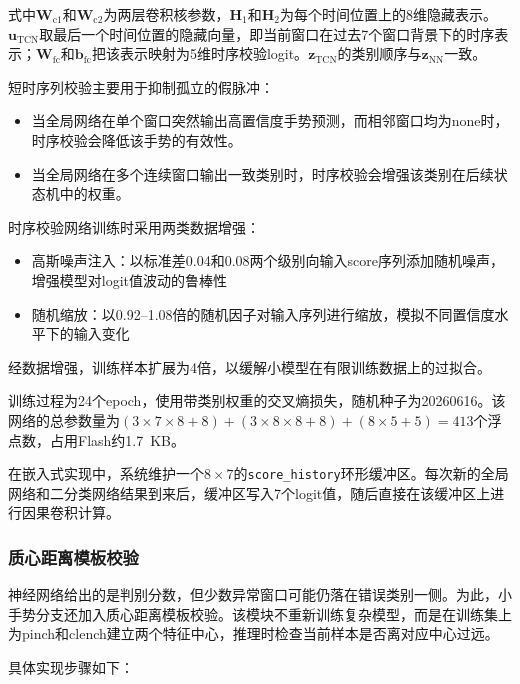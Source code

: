 \documentclass[lettersize,journal]{IEEEtran}
\begin{document}
式中$\mathbf{W}_\mathrm{c1}$和$\mathbf{W}_\mathrm{c2}$为两层卷积核参数，$\mathbf{H}_1$和$\mathbf{H}_2$为每个时间位置上的8维隐藏表示。$\mathbf{u}_\mathrm{TCN}$取最后一个时间位置的隐藏向量，即当前窗口在过去7个窗口背景下的时序表示；$\mathbf{W}_\mathrm{fc}$和$\mathbf{b}_\mathrm{fc}$把该表示映射为5维时序校验logit。$\mathbf{z}_\mathrm{TCN}$的类别顺序与$\mathbf{z}_\mathrm{NN}$一致。

短时序列校验主要用于抑制孤立的假脉冲：
\begin{itemize}[leftmargin=*]
    \item 当全局网络在单个窗口突然输出高置信度手势预测，而相邻窗口均为none时，时序校验会降低该手势的有效性。
    \item 当全局网络在多个连续窗口输出一致类别时，时序校验会增强该类别在后续状态机中的权重。
\end{itemize}

时序校验网络训练时采用两类数据增强：
\begin{itemize}[leftmargin=*]
    \item 高斯噪声注入：以标准差0.04和0.08两个级别向输入score序列添加随机噪声，增强模型对logit值波动的鲁棒性
    \item 随机缩放：以0.92--1.08倍的随机因子对输入序列进行缩放，模拟不同置信度水平下的输入变化
\end{itemize}

经数据增强，训练样本扩展为4倍，以缓解小模型在有限训练数据上的过拟合。

训练过程为24个epoch，使用带类别权重的交叉熵损失，随机种子为20260616。该网络的总参数量为$(3 \times 7 \times 8 + 8) + (3 \times 8 \times 8 + 8) + (8 \times 5 + 5) = 413$个浮点数，占用Flash约1.7~KB。

在嵌入式实现中，系统维护一个$8 \times 7$的\texttt{score\_history}环形缓冲区。每次新的全局网络和二分类网络结果到来后，缓冲区写入7个logit值，随后直接在该缓冲区上进行因果卷积计算。

\subsubsection{质心距离模板校验}

神经网络给出的是判别分数，但少数异常窗口可能仍落在错误类别一侧。为此，小手势分支还加入质心距离模板校验。该模块不重新训练复杂模型，而是在训练集上为pinch和clench建立两个特征中心，推理时检查当前样本是否离对应中心过远。

具体实现步骤如下：
\end{document}
